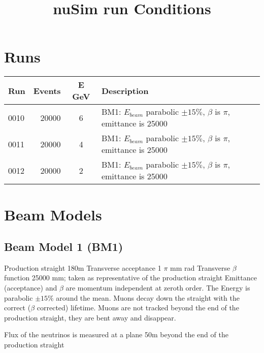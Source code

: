 \documentclass{article}
\newcommand{\nl}{\hfill\newline}
\newcommand{\runList}{ \noindent \begin{tabular}{|  l | r | c | p{12.0cm} | } \hline Run  & Events   &  E GeV &   Description\\  \hline }
\newcommand{\run}[4]{ {#1}  & {#2}  & {#3} & {#4} \\}
\newcommand{\runListEnd} { \hline \end{tabular}  \nl}
\begin{document}
\title{nuSim run Conditions}
\author{}
\maketitle

 \setlength{\parindent}{0pt}


\section{Runs}

\runList
\run {0010}{20000}{6}{BM1: $E_{beam}$ parabolic  $\pm 15 \%$, $\beta$ is $\pi$, emittance is 25000}
\hline
\run {0011}{20000}{4}{BM1: $E_{beam}$ parabolic  $\pm 15 \%$, $\beta$ is  $\pi$, emittance is 25000}
\hline
\run {0012}{20000}{2}{BM1: $E_{beam}$ parabolic  $\pm 15 \%$, $\beta$ is  $\pi$, emittance is 25000}
\runListEnd


\section{Beam Models}
\subsection{Beam Model 1 (BM1)}

Production straight 180m\hfill\nl
Transverse acceptance 1 $\pi$ mm rad \hfill\nl
Transverse $\beta$ function 25000 mm; taken as representative of the production straight\nl
Emittance (acceptance) and $\beta$ are momentum independent at zeroth order.\nl
The Energy is parabolic $\pm 15 \%$ around the mean.
Muons decay down the straight with the correct ($\beta$ corrected) lifetime. Muons are not tracked
beyond the end of the production straight, they are bent away and disappear.

Flux of the neutrinos is measured at a plane 50m beyond the end of the production straight
\end{document}
